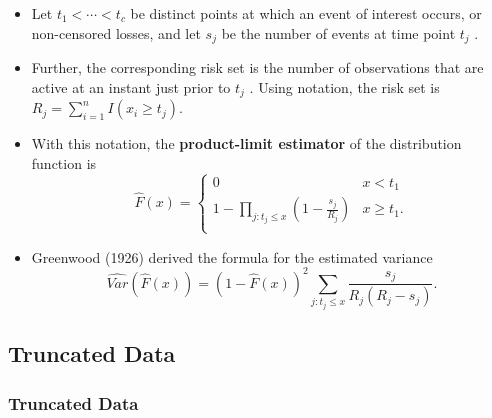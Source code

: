 \documentclass[]{book}
\begin{document}
\begin{itemize}
\item
  Let \(t_{1} <\cdots< t_{c}\) be distinct points at which an event of
  interest occurs, or non-censored losses, and let \(s_j\) be the number
  of events at time point \(t_{j}\) .
\item
  Further, the corresponding risk set is the number of observations that
  are active at an instant just prior to \(t_{j}\) . Using notation, the
  risk set is \(R_{j}=\sum_{i=1}^{n}I(x_{i}\geq t_{j})\).
\item
  With this notation, the \textbf{product-limit estimator} of the
  distribution function is \[\hat{F}(x)=
  \left\lbrace
  \begin{array}{llll}
  0 &
  x < t_{1} \\
  1-\prod_{j:t_{j} \leq x}\left( 1-\frac{s_j}{R_{j}}\right)  &
  x \geq t_{1} .\\
  \end{array}
  \right .\]
\item
  Greenwood (1926) derived the formula for the estimated variance
  \[\widehat{Var}(\hat{F}(x)) =
  (1-\hat{F}(x))^{2}
  \sum _{j:t_{j} \leq x} \dfrac{s_j}{R_{j}(R_{j}-s_j)}.\]
\end{itemize}

\subsection{Truncated Data}\label{truncated-data}

\subsubsection{Truncated Data}\label{truncated-data-1}
\end{document}
